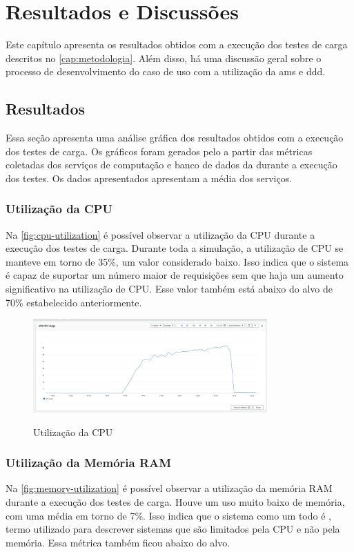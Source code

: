 \chapter{Resultados e Discussões}
\label{cap:resultados}
Este capítulo apresenta os resultados obtidos com a execução dos testes de carga descritos no \autoref{cap:metodologia}. Além disso, há uma discussão geral sobre o processo de desenvolvimento do caso de uso com a utilização da \acrfull{ams} e \acrfull{ddd}.

\section{Resultados}
Essa seção apresenta uma análise gráfica dos resultados obtidos com a execução dos testes de carga. Os gráficos foram gerados pelo  a partir das métricas coletadas dos serviços de computação e banco de dados da  durante a execução dos testes. Os dados apresentados apresentam a média dos serviços.

\subsection{Utilização da CPU}
Na \autoref{fig:cpu-utilization} é possível observar a utilização da CPU durante a execução dos testes de carga. Durante toda a simulação, a utilização de CPU se manteve em torno de 35\%, um valor considerado baixo. Isso indica que o sistema é capaz de suportar um número maior de requisições sem que haja um aumento significativo na utilização de CPU. Esse valor também está abaixo do alvo de 70\% estabelecido anteriormente. 

\begin{figure}[H]
    \centering
    \caption{Utilização da CPU}
    \includegraphics[width=0.8\textwidth]{media/cpu-usage.png}
    \label{fig:cpu-utilization}
\end{figure}

\subsection{Utilização da Memória RAM}
Na \autoref{fig:memory-utilization} é possível observar a utilização da memória RAM durante a execução dos testes de carga. Houve um uso muito baixo de memória, com uma média em torno de 7\%. Isso indica que o sistema como um todo é , termo utilizado para descrever sistemas que são limitados pela CPU e não pela memória. Essa métrica também ficou abaixo do alvo.

